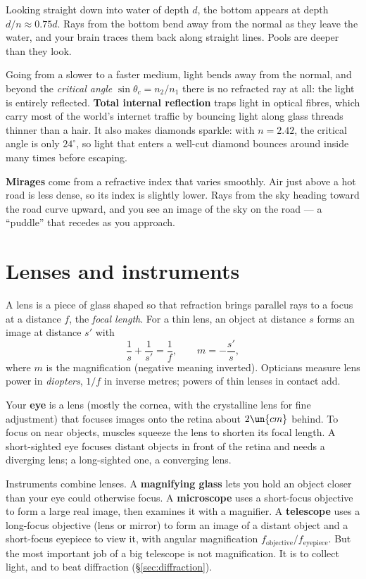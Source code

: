 \begin{example}
Looking straight down into water of depth $d$, the bottom appears at depth $d/n\approx0.75d$. Rays from the bottom bend away from the normal as they leave the water, and your brain traces them back along straight lines. Pools are deeper than they look.
\end{example}

Going from a slower to a faster medium, light bends away from the normal, and beyond the \emph{critical angle} $\sin\theta_c = n_2/n_1$ there is no refracted ray at all: the light is entirely reflected. \textbf{Total internal reflection} traps light in optical fibres, which carry most of the world's internet traffic by bouncing light along glass threads thinner than a hair. It also makes diamonds sparkle: with $n = 2.42$, the critical angle is only $24^\circ$, so light that enters a well-cut diamond bounces around inside many times before escaping.

\textbf{Mirages} come from a refractive index that varies smoothly. Air just above a hot road is less dense, so its index is slightly lower. Rays from the sky heading toward the road curve upward, and you see an image of the sky on the road --- a ``puddle'' that recedes as you approach.

\section{Lenses and instruments}

A lens is a piece of glass shaped so that refraction brings parallel rays to a focus at a distance $f$, the \emph{focal length}. For a thin lens, an object at distance $s$ forms an image at distance $s'$ with
\[
  \frac{1}{s} + \frac{1}{s'} = \frac{1}{f}, \qquad m = -\frac{s'}{s},
\]
where $m$ is the magnification (negative meaning inverted). Opticians measure lens power in \emph{diopters}, $1/f$ in inverse metres; powers of thin lenses in contact add.

Your \textbf{eye} is a lens (mostly the cornea, with the crystalline lens for fine adjustment) that focuses images onto the retina about $2\un{cm}$ behind. To focus on near objects, muscles squeeze the lens to shorten its focal length. A short-sighted eye focuses distant objects in front of the retina and needs a diverging lens; a long-sighted one, a converging lens.

Instruments combine lenses. A \textbf{magnifying glass} lets you hold an object closer than your eye could otherwise focus. A \textbf{microscope} uses a short-focus objective to form a large real image, then examines it with a magnifier. A \textbf{telescope} uses a long-focus objective (lens or mirror) to form an image of a distant object and a short-focus eyepiece to view it, with angular magnification $f_{\text{objective}}/f_{\text{eyepiece}}$. But the most important job of a big telescope is not magnification. It is to collect light, and to beat diffraction (\S\ref{sec:diffraction}).

